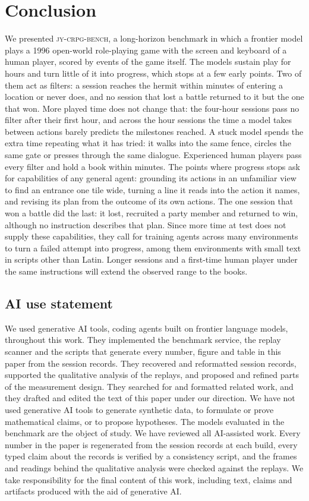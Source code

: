 \documentclass{article} %
\newcommand{\bench}{\textsc{jy-crpg-bench}}
\begin{document}
\section{Conclusion}
\label{sec:conclusion}

We presented \bench{}, a long-horizon benchmark in which a frontier model plays a 1996 open-world role-playing game with the screen and keyboard of a human player, scored by events of the game itself. The models sustain play for hours and turn little of it into progress, which stops at a few early points. Two of them act as filters: a session reaches the hermit within \FilterWait{} minutes of entering a location or never does, and no session that lost a battle returned to it but the one that won. More played time does not change that: the four-hour sessions pass no filter after their first hour, and across the hour sessions the time a model takes between actions barely predicts the milestones reached. A stuck model spends the extra time repeating what it has tried: it walks into the same fence, circles the same gate or presses through the same dialogue. Experienced human players pass every filter and hold a book within \LhumanBookLast{} minutes. The points where progress stops ask for capabilities of any general agent: grounding its actions in an unfamiliar view to find an entrance one tile wide, turning a line it reads into the action it names, and revising its plan from the outcome of its own actions. The one session that won a battle did the last: it lost, recruited a party member and returned to win, although no instruction describes that plan. Since more time at test does not supply these capabilities, they call for training agents across many environments to turn a failed attempt into progress, among them environments with small text in scripts other than Latin. Longer sessions and a first-time human player under the same instructions will extend the observed range to the books.

\subsection*{AI use statement}
We used generative AI tools, coding agents built on frontier language models, throughout this work. They implemented the benchmark service, the replay scanner and the scripts that generate every number, figure and table in this paper from the session records. They recovered and reformatted session records, supported the qualitative analysis of the replays, and proposed and refined parts of the measurement design. They searched for and formatted related work, and they drafted and edited the text of this paper under our direction. We have not used generative AI tools to generate synthetic data, to formulate or prove mathematical claims, or to propose hypotheses. The models evaluated in the benchmark are the object of study. We have reviewed all AI-assisted work. Every number in the paper is regenerated from the session records at each build, every typed claim about the records is verified by a consistency script, and the frames and readings behind the qualitative analysis were checked against the replays. We take responsibility for the final content of this work, including text, claims and artifacts produced with the aid of generative AI.
\end{document}
